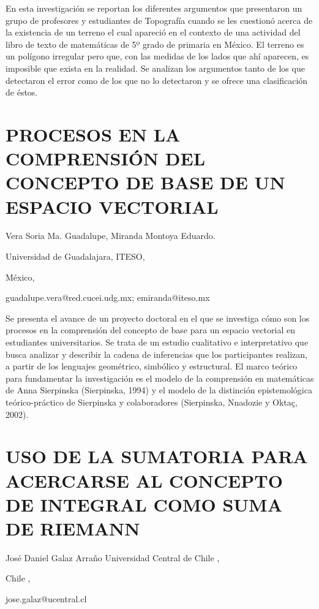 En esta investigación se reportan los diferentes argumentos que presentaron
un grupo de profesores y estudiantes de Topografía cuando se les cuestionó
acerca de la existencia de un terreno el cual apareció en el contexto
de una actividad del libro de texto de matemáticas de 5º grado de
primaria en México. El terreno es un polígono irregular pero que,
con las medidas de los lados que ahí aparecen, es imposible que exista
en la realidad. Se analizan los argumentos tanto de los que detectaron
el error como de los que no lo detectaron y se ofrece una clasificación
de éstos. 


\section{PROCESOS EN LA COMPRENSIÓN DEL CONCEPTO DE BASE DE UN ESPACIO VECTORIAL}

\begin{datos}

Vera Soria Ma. Guadalupe, Miranda Montoya Eduardo.

Universidad de Guadalajara, ITESO,

México,

guadalupe.vera@red.cucei.udg.mx; emiranda@iteso.mx

\end{datos}

Se presenta el avance de un proyecto doctoral en el que se investiga
cómo son los procesos en la comprensión del concepto de base para
un espacio vectorial en estudiantes universitarios. Se trata de un
estudio cualitativo e interpretativo que busca analizar y describir
la cadena de inferencias que los participantes realizan, a partir
de los lenguajes geométrico, simbólico y estructural. El marco teórico
para fundamentar la investigación es el modelo de la comprensión en
matemáticas de Anna Sierpinska (Sierpinska, 1994) y el modelo de la
distinción epistemológica teórico-práctico de Sierpinska y colaboradores
(Sierpinska, Nnadozie y Oktaç, 2002). 


\section{USO DE LA SUMATORIA PARA ACERCARSE AL CONCEPTO DE INTEGRAL COMO SUMA
DE RIEMANN}

\begin{datos}

José Daniel Galaz Arraño Universidad Central de Chile ,

Chile ,

jose.galaz@ucentral.cl

\end{datos}

